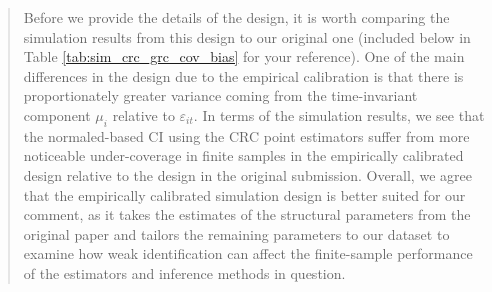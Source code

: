 \documentclass{article}[11pt]
\begin{document}
\begin{enumerate}
\begin{quote}
    Before we provide the details of the design, it is worth comparing the simulation results from this design to our original one (included below in Table \ref{tab:sim_crc_grc_cov_bias} for your reference). One of the main differences in the design due to the empirical calibration is that there is proportionately greater variance coming from the time-invariant component $\mu_i$ relative to $\varepsilon_{it}$. In terms of the simulation results, we see that the normaled-based CI using the CRC point estimators suffer from more noticeable under-coverage in finite samples in the empirically calibrated design relative to the design in the original submission. Overall, we agree that the empirically calibrated simulation design is better suited for our comment, as it takes the estimates of the structural parameters from the original paper and tailors the remaining parameters to our dataset to examine how weak identification can affect the finite-sample performance of the estimators and inference methods in question.
    

\end{quote}
\end{enumerate}
\end{document}
